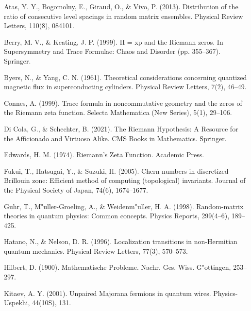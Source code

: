\documentclass[10pt]{article}
\begin{document}
\begin{enumerate}[label={[\arabic*]}, leftmargin=2.2em, itemsep=1pt]

\item Atas, Y. Y., Bogomolny, E., Giraud, O., \& Vivo, P. (2013). Distribution of the ratio of consecutive level spacings in random matrix ensembles. Physical Review Letters, 110(8), 084101.

\item Berry, M. V., \& Keating, J. P. (1999). H = xp and the Riemann zeros. In Supersymmetry and Trace Formulae: Chaos and Disorder (pp. 355--367). Springer.

\item Byers, N., \& Yang, C. N. (1961). Theoretical considerations concerning quantized magnetic flux in superconducting cylinders. Physical Review Letters, 7(2), 46--49.

\item Connes, A. (1999). Trace formula in noncommutative geometry and the zeros of the Riemann zeta function. Selecta Mathematica (New Series), 5(1), 29--106.

\item Di Cola, G., \& Schechter, B. (2021). The Riemann Hypothesis: A Resource for the Afficionado and Virtuoso Alike. CMS Books in Mathematics. Springer.

\item Edwards, H. M. (1974). Riemann's Zeta Function. Academic Press.

\item Fukui, T., Hatsugai, Y., \& Suzuki, H. (2005). Chern numbers in discretized Brillouin zone: Efficient method of computing (topological) invariants. Journal of the Physical Society of Japan, 74(6), 1674--1677.

\item Guhr, T., M"uller-Groeling, A., \& Weidenm"uller, H. A. (1998). Random-matrix theories in quantum physics: Common concepts. Physics Reports, 299(4--6), 189--425.

\item Hatano, N., \& Nelson, D. R. (1996). Localization transitions in non-Hermitian quantum mechanics. Physical Review Letters, 77(3), 570--573.

\item Hilbert, D. (1900). Mathematische Probleme. Nachr. Ges. Wiss. G"ottingen, 253--297.

\item Kitaev, A. Y. (2001). Unpaired Majorana fermions in quantum wires. Physics-Uspekhi, 44(10S), 131.


\end{enumerate}
\end{document}
